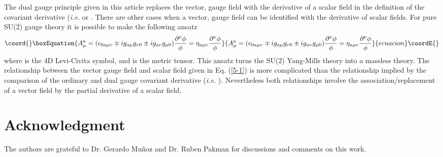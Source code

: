 \documentclass[a4paper,aps]{revtex4}
\begin{document}
The dual gauge principle given in this article replaces
the vector, gauge field with the derivative of a scalar field in
the definition of the covariant derivative ({\it i.e.} \coordHE{} or
\coordHE{}. There are other cases
when a vector, gauge field can be identified with the derivative
of scalar fields. For pure SU(2) gauge theory it is possible to
make the following ansatz \cite{corr} \cite{wilc}
\begin{equation}\coord{}\boxEquation{
\label{5-1}
A_{\mu}^a=(\epsilon_{0 a \mu \nu} \mp i g_{a \mu}
g_{\nu 0}\pm i g_{a \nu} g_{\mu 0}) \frac{\partial ^{\nu}
\phi}{\phi}  =\eta _{a\mu \nu} \frac{\partial ^{\nu} \phi}{\phi}
}{
A_{\mu}^a=(\epsilon_{0 a \mu \nu} \mp i g_{a \mu}
g_{\nu 0}\pm i g_{a \nu} g_{\mu 0}) \frac{\partial ^{\nu}
\phi}{\phi}  =\eta _{a\mu \nu} \frac{\partial ^{\nu} \phi}{\phi}
}{ecuacion}\coordE{}\end{equation}
where \myHighlight{$\epsilon_{\alpha \beta \mu \nu}$}\coordHE{} is the 4D Levi-Civita
symbol, and \coordHE{} is the metric tensor. 
This ansatz turns the SU(2) Yang-Mills theory into a
massless \coordHE{} theory. The
relationship between the vector gauge field and scalar
field given in Eq. (\ref{5-1}) is more complicated than
the relationship implied by the comparison of the ordinary
and dual gauge covariant derivative ({\it i.e.}
\coordHE{}).
Nevertheless both relationships involve the association/replacement
of a vector field by the partial derivative of a scalar
field.


\section{Acknowledgment} The authors are grateful to Dr. Gerardo
Mu{\~n}oz and Dr. Ruben Pakman for discussions and comments on
this work.
\end{document}
